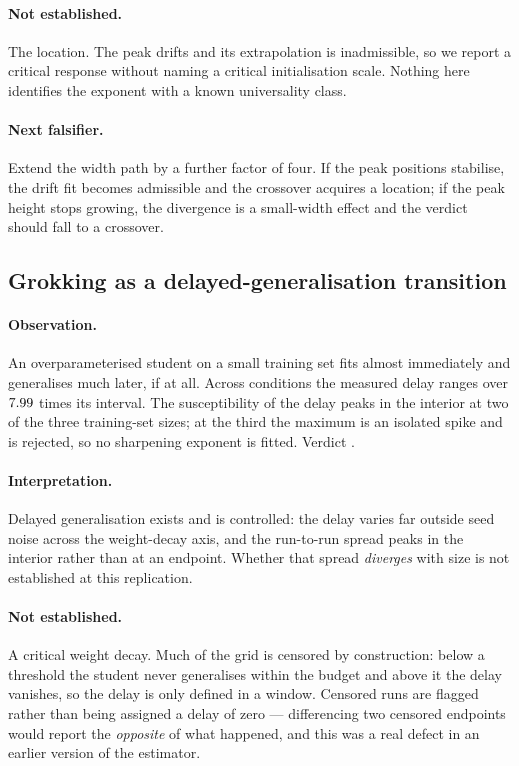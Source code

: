 \paragraph{Not established.}
The location. The peak drifts and its extrapolation is inadmissible, so we
report a critical response without naming a critical initialisation scale.
Nothing here identifies the exponent with a known universality class.

\paragraph{Next falsifier.}
Extend the width path by a further factor of four. If the peak positions
stabilise, the drift fit becomes admissible and the crossover acquires a
location; if the peak height stops growing, the divergence is a small-width
effect and the verdict should fall to a crossover.

\subsection{Grokking as a delayed-generalisation transition}

\paragraph{Observation.}
An overparameterised student on a small training set fits almost immediately
and generalises much later, if at all. Across
\AtlasGrokkingConditions{} conditions the measured delay ranges over
$7.99{}$ times its interval. The susceptibility of the
delay peaks in the interior at two of the three training-set sizes; at the
third the maximum is an isolated spike and is rejected, so no sharpening
exponent is fitted. Verdict \emph{\AtlasGrokkingVerdict{}}.

\paragraph{Interpretation.}
Delayed generalisation exists and is controlled: the delay varies far outside
seed noise across the weight-decay axis, and the run-to-run spread peaks in the
interior rather than at an endpoint. Whether that spread \emph{diverges} with
size is not established at this replication.

\paragraph{Not established.}
A critical weight decay. Much of the grid is censored by construction: below a
threshold the student never generalises within the budget and above it the
delay vanishes, so the delay is only defined in a window. Censored runs are
flagged rather than being assigned a delay of zero --- differencing two censored
endpoints would report the \emph{opposite} of what happened, and this was a real
defect in an earlier version of the estimator.

